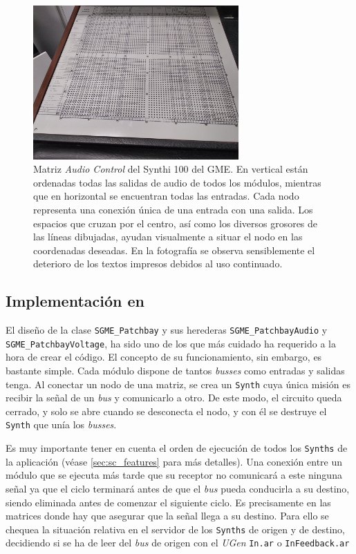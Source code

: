 \begin{figure}
	\centering
	\includegraphics[width=0.7\textwidth]{images/patchbay_audio_vista_gral}
	\caption[Matriz \textit{Audio Control} del Synthi 100 del GME]{Matriz \textit{Audio Control} del Synthi 100 del GME. En vertical están ordenadas todas las salidas de audio de todos los módulos, mientras que en horizontal se encuentran todas las entradas. Cada nodo representa una conexión única de una entrada con una salida. Los espacios que cruzan por el centro, así como los diversos grosores de las líneas dibujadas, ayudan visualmente a situar el nodo en las coordenadas deseadas. En la fotografía se observa sensiblemente el deterioro de los textos impresos debidos al uso continuado.}
	\label{fig:patchbay_audio_vista_gral}
\end{figure}

\subsection{Implementación en \appName}

El diseño de la clase \texttt{SGME\_Patchbay} y sus herederas \texttt{SGME\_PatchbayAudio} y \texttt{SGME\_PatchbayVoltage}, ha sido uno de los que más cuidado ha requerido a la hora de crear el código. El concepto de su funcionamiento, sin embargo, es bastante simple. Cada módulo dispone de tantos \textit{busses} como entradas y salidas tenga. Al conectar un nodo de una matriz, se crea un \texttt{Synth} cuya única misión es recibir la señal de un \textit{bus} y comunicarlo a otro. De este modo, el circuito queda cerrado, y solo se abre cuando se desconecta el nodo, y con él se destruye el \texttt{Synth} que unía los \textit{busses}.

Es muy importante tener en cuenta el orden de ejecución de todos los \texttt{Synths} de la aplicación (véase \ref{sec:sc_features} para más detalles). Una conexión entre un módulo que se ejecuta más tarde que su receptor no comunicará a este ninguna señal ya que el ciclo terminará antes de que el \textit{bus} pueda conducirla a su destino, siendo eliminada antes de comenzar el siguiente ciclo. Es precisamente en las matrices donde hay que asegurar que la señal llega a su destino. Para ello se chequea la situación relativa en el servidor de los \texttt{Synths} de origen y de destino, decidiendo si se ha de leer del \textit{bus} de origen con el \textit{UGen} \texttt{In.ar} o \texttt{InFeedback.ar}


